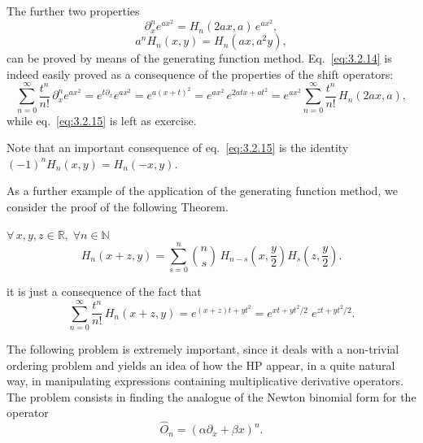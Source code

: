 The further two properties
\begin{equation}
\partial_x^n e^{ax^2}=H_n(2ax,a)\,e^{ax^2},
\label{eq:3.2.14}
\end{equation}
\begin{equation}
a^n H_n(x,y)=H_n(ax,a^2y),
\label{eq:3.2.15}
\end{equation}
can be proved by means of the generating function method.
Eq.~\eqref{eq:3.2.14} is indeed easily proved as a consequence of
the properties of the shift operators:
\[
\sum_{n=0}^{\infty}\frac{t^n}{n!}\,\partial_x^n e^{ax^2}
=e^{t\partial_x}e^{ax^2}=e^{a(x+t)^2}
=e^{ax^2}\,e^{2atx+at^2}
=e^{ax^2}\sum_{n=0}^{\infty}\frac{t^n}{n!}\,H_n(2ax,a),
\]
while eq.~\eqref{eq:3.2.15} is left as exercise.

 Note that an important consequence of
eq.~\eqref{eq:3.2.15} is the identity
$(-1)^n H_n(x,y)=H_n(-x,y)$.

\medskip
As a further example of the application of the generating function
method, we consider the proof of the following Theorem.

\begin{theorem}[Addition]
$\forall\,x,y,z\in\mathbb{R},\;\forall n\in\mathbb{N}$
\begin{equation}
H_n(x+z,y)=\sum_{s=0}^{n}\binom{n}{s}\,
H_{n-s}\!\left(x,\frac{y}{2}\right)
H_s\!\left(z,\frac{y}{2}\right).
\label{eq:3.2.17}
\end{equation}
\end{theorem}

 it is just a consequence of the fact that
\[
\sum_{n=0}^{\infty}\frac{t^n}{n!}\,H_n(x+z,y)
=e^{(x+z)t+yt^2}
=e^{xt+yt^2/2}\;e^{zt+yt^2/2}.
\tag{3.2.18}
\]

The following problem is extremely important, since it deals with a
non-trivial ordering problem and yields an idea of how the HP appear,
in a quite natural way, in manipulating expressions containing
multiplicative derivative operators. The problem consists in finding
the analogue of the Newton binomial form for the operator
\begin{equation}
\hat O_n=(\alpha\partial_x+\beta x)^n.
\label{eq:3.2.19}
\end{equation}

